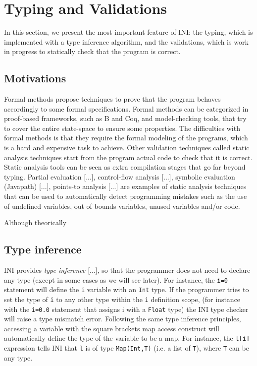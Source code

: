 \documentclass{sig-alternate}
\begin{document}
\section{Typing and Validations}

In this section, we present the most important feature of INI: the typing, which is implemented with a type inference algorithm, and the validations, which is work in progress to statically check that the program is correct. 

\subsection{Motivations}

Formal methods propose techniques to prove that the program behaves accordingly to some formal specifications. Formal methods can be categorized in proof-based frameworks, such as B and Coq, and model-checking tools, that try to cover the entire state-space to ensure some properties. The difficulties with formal methods is that they require the formal modeling of the programs, which is a hard and expensive task to achieve. Other validation techniques called static analysis techniques start from the program actual code to check that it is correct. Static analysis tools can be seen as extra compilation stages that go far beyond typing. Partial evaluation [...], control-flow analysis [...], symbolic evaluation (Javapath) [...], points-to analysis [...] are examples of static analysis techniques that can be used to automatically detect programming mistakes such as the use of undefined variables, out of bounds variables, unused variables and/or code.

Although theorically 

\subsection{Type inference}

INI provides \emph{type inference} [...], so that the programmer does not need to declare any type (except in some cases as we will see later). For instance, the \texttt{i=0} statement will define the \texttt{i} variable with an \texttt{Int} type. If the programmer tries to set the type of \texttt{i} to any other type within the \texttt{i} definition scope, (for instance with the \texttt{i=0.0} statement that assigns i with a \texttt{Float} type) the INI type checker will raise a type mismatch error. Following the same type inference principles, accessing a variable with the square brackets map access construct will automatically define the type of the variable to be a map. For instance, the \texttt{l[i]} expression tells INI that \texttt{l} is of type \texttt{Map(Int,T)} (i.e. a list of \texttt{T}), where \texttt{T} can be any type. 
\end{document}
